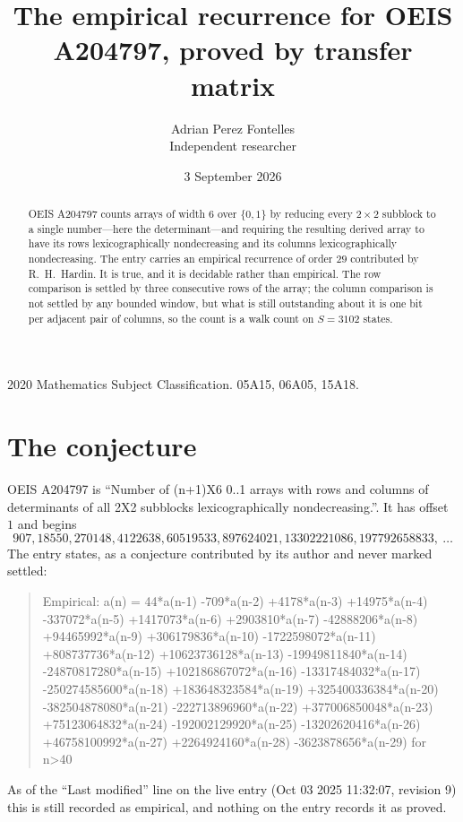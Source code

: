 \documentclass[11pt,a4paper]{article}
\title{The empirical recurrence for OEIS A204797, proved by transfer matrix}
\author{Adrian Perez Fontelles\\ \small Independent researcher}
\date{3 September 2026}
\theoremstyle{plain}
\theoremstyle{definition}
\begin{document}
\maketitle

\begin{abstract}
OEIS A204797 counts arrays of width $6$ over $\{0,1\}$ by reducing every $2\times2$ subblock to a
single number---here the determinant---and requiring the resulting derived array to have its rows
lexicographically nondecreasing and its columns lexicographically nondecreasing. The entry carries an
empirical recurrence of order $29$ contributed by R.~H.~Hardin. It is true, and it is
decidable rather than empirical. The row comparison is settled by three consecutive rows of the
array; the column comparison is not settled by any bounded window, but what is still outstanding
about it is one bit per adjacent pair of columns, so the count is a walk count on $S=3102$
states.
\end{abstract}

\noindent\small 2020 Mathematics Subject Classification. 05A15, 06A05, 15A18.\normalsize

\section{The conjecture}

OEIS A204797 is ``Number of (n+1)X6 0..1 arrays with rows and columns of determinants of all 2X2 subblocks lexicographically nondecreasing.''. It has offset $1$ and begins
\[
907, 18550, 270148, 4122638, 60519533, 897624021, 13302221086, 197792658833,\ \dots
\]
The entry states, as a conjecture contributed by its author and never marked settled:
\begin{quote}
Empirical: a(n) = 44*a(n-1) -709*a(n-2) +4178*a(n-3) +14975*a(n-4) -337072*a(n-5) +1417073*a(n-6) +2903810*a(n-7) -42888206*a(n-8) +94465992*a(n-9) +306179836*a(n-10) -1722598072*a(n-11) +808737736*a(n-12) +10623736128*a(n-13) -19949811840*a(n-14) -24870817280*a(n-15) +102186867072*a(n-16) -13317484032*a(n-17) -250274585600*a(n-18) +183648323584*a(n-19) +325400336384*a(n-20) -382504878080*a(n-21) -222713896960*a(n-22) +377006850048*a(n-23) +75123064832*a(n-24) -192002129920*a(n-25) -13202620416*a(n-26) +46758100992*a(n-27) +2264924160*a(n-28) -3623878656*a(n-29) for n>40
\end{quote}
As of the ``Last modified'' line on the live entry (Oct 03 2025 11:32:07, revision 9) this is still
recorded as empirical, and nothing on the entry records it as proved.
\end{document}
